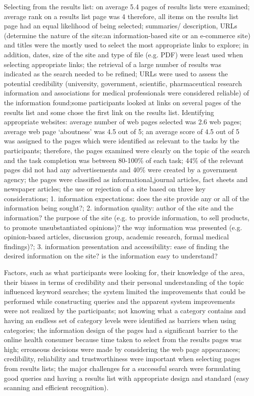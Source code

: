 \documentclass[]{article}
\begin{document}
Selecting from the results list: on average 5.4 pages of results lists were examined; average rank on a results list page was 4 therefore, all items on the results list page had an equal likelihood of being selected; summaries/ description, URLs (determine the nature of the site:an information-based site or an e-commerce site) and titles were the mostly used to select the most appropriate links to explore; in addition, dates, size of the site and type of file (e.g. PDF) were least used when selecting appropriate links; the retrieval of a large number of results was indicated as the search needed to be refined; URLs were used to  assess the potential credibility (university, government, scientific, pharmaceutical research information and associations for medical professionals were considered reliable) of the information found;some participants looked at links on several pages of the results list and some chose the first link on the results list. Identifying appropriate websites: average number of web pages selected was 2.6 web pages; average web page ‘aboutness’ was 4.5 out of 5; an average score of 4.5 out of 5 was assigned to the pages which were identified as relevant to the tasks by the participants; therefore, the pages examined were clearly on the topic of the search and the task completion was between 80-100\% of each task; 44\% of the relevant pages did not had any advertisements and 40\% were created by a government agency; the pages were classified as informational,journal articles, fact sheets and newspaper articles; the use or rejection of a site based on three key considerations; 1. information expectations: does the site provide any or all of the information being sought?; 2. information quality: author of the site and the information? the purpose of the site (e.g. to provide information, to sell products, to promote unsubstantiated opinions)? the way information was presented (e.g. opinion-based articles, discussion group, academic research, formal medical findings)?; 3. information presentation and accessibility: ease of finding the desired information on the site? is the information easy to understand?
             
Factors, such as what participants were looking for, their knowledge of the area, their biases in terms of credibility and their personal understanding of the topic influenced keyword searches; the system limited the improvements that could be performed while constructing queries and the apparent system improvements were not realized by the participants; not knowing what a category contains and having an endless set of category levels were identified as barriers when using categories; the information design of the pages had a significant barrier to the online health consumer because time taken to select from the results pages was high; erroneous decisions were made by considering the web page appearances; credibility, reliability and trustworthiness were important when selecting pages from results lists; the major challenges for a successful search were formulating good queries and having a results list with appropriate design and standard (easy scanning and efficient recognition).  
\end{document}
